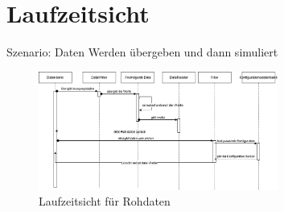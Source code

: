 \chapter{Laufzeitsicht}
\label{ch:Laufzeitsicht}

Szenario: Daten Werden übergeben und dann simuliert
\begin{figure}[tbh]
    \centering
    \includegraphics[width=0.7\textwidth]{Graphics/Laufzeit_Rohdaten.png}
    \caption{Laufzeitsicht für Rohdaten}
    \label{fig:Laufzeit}
  \end{figure}